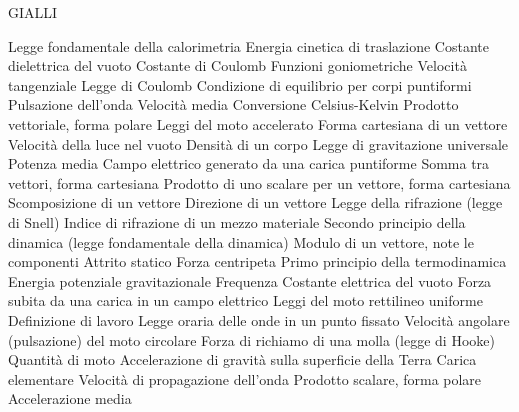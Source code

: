 \documentclass[a4paper,11pt,italian]{article}
\begin{document}
GIALLI
\begin{enumerate}
{Legge fondamentale della calorimetria}
{Energia cinetica di traslazione}
{Costante dielettrica del vuoto}
{Costante di Coulomb}
{Funzioni goniometriche}
{Velocità tangenziale}
{Legge di Coulomb}
{Condizione di equilibrio per corpi puntiformi}
{Pulsazione dell'onda}
{Velocità media}
{Conversione Celsius-Kelvin}
{Prodotto vettoriale, forma polare}
{Leggi del moto accelerato}
{Forma cartesiana di un vettore}
{Velocità della luce nel vuoto}
{Densità di un corpo}
{Legge di gravitazione universale}
{Potenza media}
{Campo elettrico generato da una carica puntiforme}
{Somma tra vettori, forma cartesiana}
{Prodotto di uno scalare per un vettore, forma cartesiana}
{Scomposizione di un vettore}
{Direzione di un vettore}
{Legge della rifrazione (legge di Snell)}
{Indice di rifrazione di un mezzo materiale}
{Secondo principio della dinamica (legge fondamentale della dinamica)}
{Modulo di un vettore, note le componenti}
{Attrito statico}
{Forza centripeta}
{Primo principio della termodinamica}
{Energia potenziale gravitazionale}
{Frequenza}
{Costante elettrica del vuoto}
{Forza subita da una carica in un campo elettrico}
{Leggi del moto rettilineo uniforme}
{Definizione di lavoro}
{Legge oraria delle onde in un punto fissato}
{Velocità angolare (pulsazione) del moto circolare}
{Forza di richiamo di una molla (legge di Hooke)}
{Quantità di moto}
{Accelerazione di gravità sulla superficie della Terra}
{Carica elementare}
{Velocità di propagazione dell'onda}
{Prodotto scalare, forma polare}
{Accelerazione media}
\end{enumerate}
\end{document}
